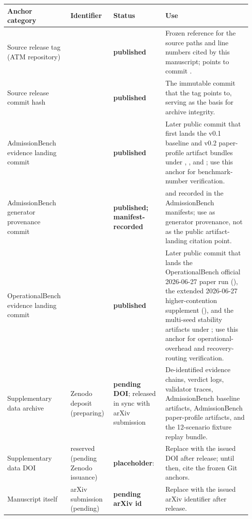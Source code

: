 \documentclass[9pt,letterpaper]{extarticle}
\begin{document}
\begingroup
\tiny
\setlength{\tabcolsep}{2pt}
\begin{longtable}{@{}L{0.18\textwidth}L{0.27\textwidth}L{0.18\textwidth}L{0.31\textwidth}@{}}
\toprule
Anchor category & Identifier & Status & Use \\
\midrule
Source release tag (ATM repository) & \texttt{} & \textbf{published} & Frozen reference for the source paths and line numbers cited by this manuscript; points to commit \texttt{}. \\
Source release commit hash & \texttt{} & \textbf{published} & The immutable commit that the tag points to, serving as the basis for archive integrity. \\
AdmissionBench evidence landing commit & \texttt{} & \textbf{published} & Later public commit that first lands the v0.1 baseline and v0.2 paper-profile artifact bundles under \texttt{}, \texttt{}, and \texttt{}; use this anchor for benchmark-number verification. \\
AdmissionBench generator provenance commit & \texttt{} & \textbf{published; manifest-recorded} & \texttt{} and \texttt{} recorded in the AdmissionBench manifests; use as generator provenance, not as the public artifact-landing citation point. \\
OperationalBench evidence landing commit & \texttt{} & \textbf{published} & Later public commit that lands the OperationalBench official 2026-06-27 paper run (\texttt{}), the extended 2026-06-27 higher-contention supplement (\texttt{}), and the multi-seed stability artifacts under \texttt{}; use this anchor for operational-overhead and recovery-routing verification. \\
Supplementary data archive & Zenodo deposit (preparing) & \textbf{pending DOI}; released in sync with arXiv submission & De-identified evidence chains, verdict logs, validator traces, AdmissionBench baseline artifacts, AdmissionBench paper-profile artifacts, and the 12-scenario fixture replay bundle. \\
Supplementary data DOI & reserved (pending Zenodo issuance) & \textbf{placeholder}: \texttt{} & Replace with the issued DOI after release; until then, cite the frozen Git anchors. \\
Manuscript itself & arXiv submission (pending) & \textbf{pending arXiv id} & Replace with the issued arXiv identifier after release. \\
\bottomrule
\end{longtable}
\endgroup
\end{document}
